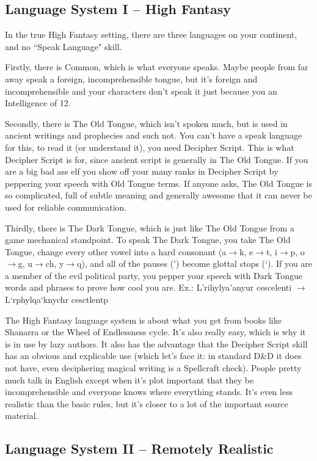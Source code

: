 \subsection{Language System I -- High Fantasy}

In the true High Fantasy setting, there are three languages on your continent, and no ``Speak Language" skill.

Firstly, there is Common, which is what everyone speaks. Maybe people from far away speak a foreign, incomprehensible tongue, but it's foreign and incomprehensible and your characters don't speak it just because you an Intelligence of 12.

Secondly, there is The Old Tongue, which isn't spoken much, but is used in ancient writings and prophecies and such not. You can't have a speak language for this, to read it (or understand it), you need Decipher Script. This is what Decipher Script is for, since ancient script is generally in The Old Tongue. If you are a big bad ass elf you show off your many ranks in Decipher Script by peppering your speech with Old Tongue terms. If anyone asks, The Old Tongue is so complicated, full of subtle meaning and generally awesome that it can never be used for reliable communication.

Thirdly, there is The Dark Tongue, which is just like The Old Tongue from a game mechanical standpoint. To speak The Dark Tongue, you take The Old Tongue, change every other vowel into a hard consonant (a$\rightarrow$k, e$\rightarrow$t, i$\rightarrow$p, o$\rightarrow$g, u$\rightarrow$ch, y$\rightarrow$q), and all of the pauses (') become glottal stops (`). If you are a member of the evil political party, you pepper your speech with Dark Tongue words and phrases to prove how cool you are.
Ex.: L'rihylya'anyur cescelenti $\rightarrow$ L`rphylqa`knychr cesctlentp

The High Fantasy language system is about what you get from books like Shanarra or the Wheel of Endlessness cycle. It's also really easy, which is why it is in use by lazy authors. It also has the advantage that the Decipher Script skill has an obvious and explicable use (which let's face it: in standard D\&D it does not have, even deciphering magical writing is a Spellcraft check). People pretty much talk in English except when it's plot important that they be incomprehensible and everyone knows where everything stands. It's even less realistic than the basic rules, but it's closer to a lot of the important source material.

\subsection{Language System II -- Remotely Realistic}

